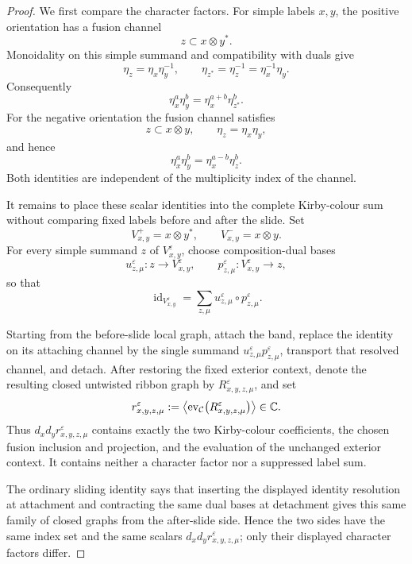\begin{proof}
We first compare the character factors.  For simple labels \(x,y\), the
positive orientation has a fusion channel
\[
  z\subset x\otimes y^*.
\]
Monoidality on this simple summand and compatibility with duals give
\[
  \eta_z=\eta_x\eta_y^{-1},
  \qquad
  \eta_{z^*}=\eta_z^{-1}=\eta_x^{-1}\eta_y.
\]
Consequently
\begin{equation*}
  \eta_x^a\eta_y^b
  =\eta_x^{a+b}\eta_{z^*}^b.
  \tag{\(C_+\)}
\end{equation*}
For the negative orientation the fusion channel satisfies
\[
  z\subset x\otimes y,
  \qquad
  \eta_z=\eta_x\eta_y,
\]
and hence
\begin{equation*}
  \eta_x^a\eta_y^b
  =\eta_x^{a-b}\eta_z^b.
  \tag{\(C_-\)}
\end{equation*}
Both identities are independent of the multiplicity index of the channel.

It remains to place these scalar identities into the complete Kirby-colour
sum without comparing fixed labels before and after the slide.  Set
\[
  V^+_{x,y}=x\otimes y^*,
  \qquad
  V^-_{x,y}=x\otimes y.
\]
For every simple summand \(z\) of \(V^\varepsilon_{x,y}\), choose
composition-dual bases
\[
  u^\varepsilon_{z,\mu}\colon z\longrightarrow V^\varepsilon_{x,y},
  \qquad
  p^\varepsilon_{z,\mu}\colon V^\varepsilon_{x,y}\longrightarrow z,
\]
so that
\[
  \operatorname{id}_{V^\varepsilon_{x,y}}
  =\sum_{z,\mu}
    u^\varepsilon_{z,\mu}\circ p^\varepsilon_{z,\mu}.
\]

Starting from the before-slide local graph, attach the band, replace the
identity on its attaching channel by the single summand
\(u^\varepsilon_{z,\mu}p^\varepsilon_{z,\mu}\), transport that resolved
channel, and detach.  After restoring the fixed exterior context, denote the
resulting closed untwisted ribbon graph by
\(R^\varepsilon_{x,y,z,\mu}\), and set
\[
  r^\varepsilon_{x,y,z,\mu}
  :=\left\langle
      \operatorname{ev}_{\mathcal{C}}
        \bigl(R^\varepsilon_{x,y,z,\mu}\bigr)
    \right\rangle
  \in\mathbb C.
\]
Thus \(d_xd_y r^\varepsilon_{x,y,z,\mu}\) contains exactly the two
Kirby-colour coefficients, the chosen fusion inclusion and projection, and
the evaluation of the unchanged exterior context.  It contains neither a
character factor nor a suppressed label sum.

The ordinary sliding identity \cite[Lemma~2.30]{Tham2021} says that inserting
the displayed identity resolution at attachment and contracting the same
dual bases at detachment gives this same family of closed graphs from the
after-slide side.  Hence the two sides have the same index set and the same
scalars \(d_xd_y r^\varepsilon_{x,y,z,\mu}\); only their displayed character
factors differ.


\end{proof}
